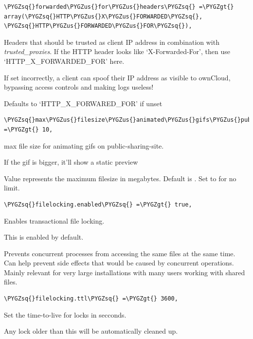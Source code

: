 \documentclass[letterpaper,10pt,english]{sphinxmanual}
\def\PYGZus{\char`\_}
\def\PYGZgt{\char`\>}
\def\PYGZsq{\char`\'}
\begin{document}
\begin{Verbatim}[commandchars=\\\{\}]
\PYGZsq{}forwarded\PYGZus{}for\PYGZus{}headers\PYGZsq{} =\PYGZgt{} array(\PYGZsq{}HTTP\PYGZus{}X\PYGZus{}FORWARDED\PYGZsq{}, \PYGZsq{}HTTP\PYGZus{}FORWARDED\PYGZus{}FOR\PYGZsq{}),
\end{Verbatim}

Headers that should be trusted as client IP address in combination with
\emph{trusted\_proxies}. If the HTTP header looks like `X-Forwarded-For', then use
`HTTP\_X\_FORWARDED\_FOR' here.

If set incorrectly, a client can spoof their IP address as visible to
ownCloud, bypassing access controls and making logs useless!

Defaults to `HTTP\_X\_FORWARED\_FOR' if unset

\begin{Verbatim}[commandchars=\\\{\}]
\PYGZsq{}max\PYGZus{}filesize\PYGZus{}animated\PYGZus{}gifs\PYGZus{}public\PYGZus{}sharing\PYGZsq{} =\PYGZgt{} 10,
\end{Verbatim}

max file size for animating gifs on public-sharing-site.

If the gif is bigger, it'll show a static preview

Value represents the maximum filesize in megabytes. Default is . Set to
 for no limit.

\begin{Verbatim}[commandchars=\\\{\}]
\PYGZsq{}filelocking.enabled\PYGZsq{} =\PYGZgt{} true,
\end{Verbatim}

Enables transactional file locking.

This is enabled by default.

Prevents concurrent processes from accessing the same files
at the same time. Can help prevent side effects that would
be caused by concurrent operations. Mainly relevant for
very large installations with many users working with
shared files.

\begin{Verbatim}[commandchars=\\\{\}]
\PYGZsq{}filelocking.ttl\PYGZsq{} =\PYGZgt{} 3600,
\end{Verbatim}

Set the time-to-live for locks in secconds.

Any lock older than this will be automatically cleaned up.
\end{document}
